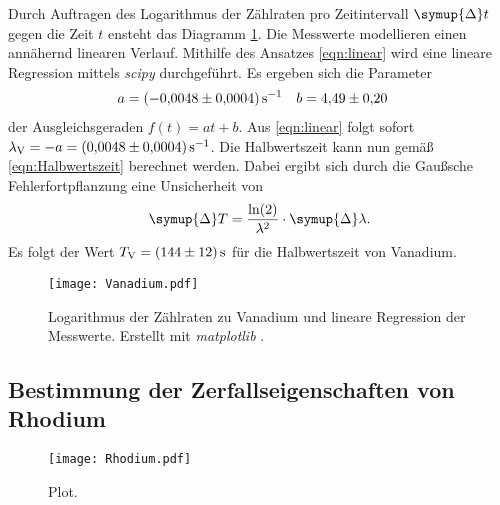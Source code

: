 Durch Auftragen des Logarithmus der Zählraten pro Zeitintervall $\symup{\Delta}t$ gegen die Zeit $t$ ensteht das Diagramm \ref{fig:Vanadium}. Die Messwerte modellieren einen 
annähernd linearen Verlauf. Mithilfe des Ansatzes \eqref{eqn:linear} wird eine lineare Regression mittels \textit{scipy} \cite{scipy} durchgeführt.
Es ergeben sich die Parameter
\begin{align*}
  a &= \qty{-0.0048+-0.0004}{\second^{-1}} & b &= \num{ 4.49+-0.20}
\end{align*}
der Ausgleichsgeraden $f(t) = at + b$. Aus \autoref{eqn:linear} folgt sofort $\lambda_\text{V} = -a = \qty{0.0048+-0.0004}{\second^{-1}}$. Die Halbwertszeit kann nun gemäß 
\autoref{eqn:Halbwertszeit} berechnet werden. Dabei ergibt sich durch die Gaußsche Fehlerfortpflanzung eine Unsicherheit von 
\begin{equation}
  \label{eqn:delta_T}
  \symup{\Delta}T = \frac{\ln(2)}{\lambda^2} \cdot \symup{\Delta} \lambda. 
\end{equation}
Es folgt der Wert $T_\text{V} = \qty{144+-12}{\second}$ für die Halbwertszeit von Vanadium. 

\begin{figure}
  \centering
  \texttt{[image: Vanadium.pdf]}
  \caption{Logarithmus der Zählraten zu Vanadium und lineare Regression der Messwerte. Erstellt mit \textit{matplotlib} \cite{matplotlib}.}
  \label{fig:Vanadium}
\end{figure}

\subsection{Bestimmung der Zerfallseigenschaften von Rhodium}
\label{subsec:A_Rhodium}

\begin{figure}
  \centering
  \texttt{[image: Rhodium.pdf]}
  \caption{Plot.}
  \label{fig:Rhodium}
\end{figure}
